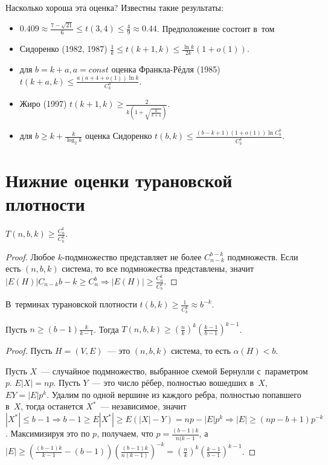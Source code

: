 \documentclass{article}
\begin{document}
Насколько хороша эта оценка? Известны такие результаты:
\begin{itemize}
	\item $0.409 \approx \frac{7 - \sqrt{21}}{6} \le t(3, 4) \le \frac{4}{9}
		\approx 0.44$. Предположение состоит в~том
	\item Сидоренко (1982, 1987) $\frac{1}{k} \le t(k+1,k) \le \frac{\ln k}{2k}(1
		+ o(1))$.
	\item для $b = k + a, a = const$ оценка Франкла-Рёдля (1985) $t(k+a,k) \le
		\frac{a(a + 4 + o(1)) \ln k}{C_k^a}$.
	\item Жиро (1997) $t(k+1,k) \ge \frac{2}{k\left(1 +
		\sqrt{\frac{k}{k+4}}\right)}$.
	\item для $b \ge k + \frac{k}{\log_2 k}$ оценка Сидоренко $t(b, k) \le
		\frac{(b - k + 1)(1 + o(1)) \ln C_b^k}{C_b^k}$.
\end{itemize}

\section{Нижние оценки турановской плотности}

\begin{claim}
	$T(n, b, k) \ge \frac{C_n^k}{C_b^k}$.
\end{claim}
\begin{proof}
	Любое $k$-подмножество представляет не более $C_{n-k}^{b-k}$ подмножеств. Если
	есть $(n, b, k)$ система, то все подмножества представлены, значит $|E(H)|
	C_{n-k}{b-k} \ge C_n^b \Rightarrow |E(H)| \ge \frac{C_n^k}{C_b^k}$.
\end{proof}

В~терминах турановской плотности $t(b,k) \ge \frac{1}{C_b^k} \approx b^{-k}$.

\begin{theorem}[Спенсер]
	Пусть $n \ge (b - 1) \frac{k}{k - 1}$. Тогда $T(n, b, k) \ge
	\left(\frac{n}{k}\right)^k \left( \frac{k-1}{b-1} \right)^{k-1}$.
\end{theorem}
\begin{proof}
	Пусть $H = (V, E)$~--- это $(n, b, k)$ система, то есть $\alpha(H) < b$.

	Пусть $X$~--- случайное подмножество, выбранное схемой Бернулли с~параметром
	$p$. $E|X| = np$. Пусть $Y$~--- это число рёбер, полностью вошедших в~$X$,
	$EY = |E| p^k$. Удалим по одной вершине из каждого ребра, полностью попавшего
	в~$X$, тогда останется $X^\ast$~--- независимое, значит $|X^\ast| \le b - 1
	\Rightarrow b - 1 \ge E|X^\ast| \ge E(|X| - Y) = np - |E|p^k \Rightarrow |E|
	\ge (np - b + 1)p^{-k}$. Максимизируя это по $p$, получаем, что $p =
	\frac{(b-1)k}{n(k-1}$, а~$|E| \ge \left( \frac{(b-1)k}{k-1} -
	(b-1)\right)\left( \frac{(b-1)k}{n(k-1)}\right)^{-k} = \left( \frac{n}{k}
	\right)^k \left( \frac{k-1}{b-1} \right)^{k-1}$.
\end{proof}
\end{document}
